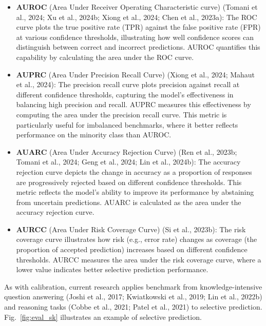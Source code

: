 \begin{itemize}
\item \textbf{AUROC} (Area Under Receiver Operating Characteristic curve) (Tomani et al., 2024; Xu et al., 2024b; Xiong et al., 2024; Chen et al., 2023a): The ROC curve plots the true positive rate (TPR) against the false positive rate (FPR) at various confidence thresholds, illustrating how well confidence scores can distinguish between correct and incorrect predictions. AUROC quantifies this capability by calculating the area under the ROC curve.
\item \textbf{AUPRC} (Area Under Precision Recall Curve) (Xiong et al., 2024; Mahaut et al., 2024): The precision recall curve plots precision against recall at different confidence thresholds, capturing the model's effectiveness in balancing high precision and recall. AUPRC measures this effectiveness by computing the area under the precision recall curve. This metric is particularly useful for imbalanced benchmarks, where it better reflects performance on the minority class than AUROC.
\item \textbf{AUARC} (Area Under Accuracy Rejection Curve) (Ren et al., 2023b; Tomani et al., 2024; Geng et al., 2024; Lin et al., 2024b): The accuracy rejection curve depicts the change in accuracy as a proportion of responses are progressively rejected based on different confidence thresholds. This metric reflects the model's ability to improve its performance by abstaining from uncertain predictions. AUARC is calculated as the area under the accuracy rejection curve.
\item \textbf{AURCC} (Area Under Risk Coverage Curve) (Si et al., 2023b): The risk coverage curve illustrates how risk (e.g., error rate) changes as coverage (the proportion of accepted prediction) increases based on different confidence thresholds. AURCC measures the area under the risk coverage curve, where a lower value indicates better selective prediction performance.
\end{itemize}
As with calibration, current research applies benchmark from knowledge-intensive question answering (Joshi et al., 2017; Kwiatkowski et al., 2019; Lin et al., 2022b) and reasoning tasks (Cobbe et al., 2021; Patel et al., 2021) to selective prediction. Fig.~\ref{fig:eval_sk} illustrates an example of selective prediction.

